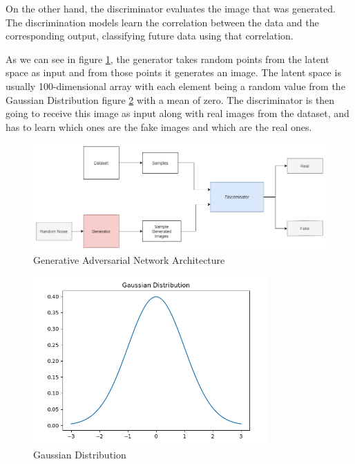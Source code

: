 \documentclass[12pt,a4paper,oneside]{memoir}
\begin{document}
\par On the other hand, the discriminator evaluates the image that was generated. The discrimination models learn the correlation between the data and the corresponding output, classifying future data using that correlation. 



\par As we can see in figure \ref{fig:gan}, the generator takes random points from the latent space as input and from those points it generates an image. The latent space is usually 100-dimensional array with each element being a random value from the Gaussian Distribution figure \ref{fig:gauss} with a mean of zero. The discriminator is then going to receive this image as input along with real images from the dataset, and has to learn which ones are the fake images and which are the real ones.



\begin{figure}[H]
\centering
\includegraphics[width=1\textwidth]{images/GAN.jpg}
\caption{Generative Adversarial Network Architecture}
\centering
\label{fig:gan}
\end{figure}



\begin{figure}[H]
\centering
\includegraphics[width=0.8\textwidth]{images/GaussianDistribution.png}
\caption{Gaussian Distribution}
\centering
\label{fig:gauss}
\end{figure}
\end{document}
